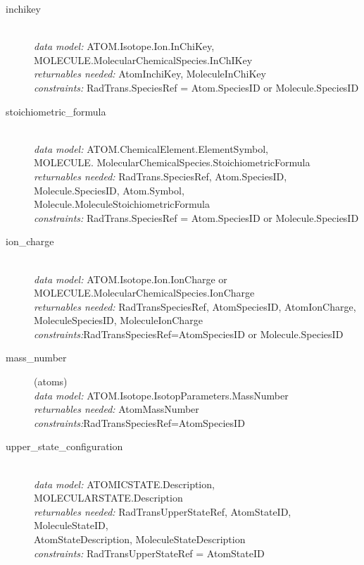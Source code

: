 \documentclass[11pt,a4paper]{ivoa}
\begin{document}
\begin{description}
\item [inchikey] \hfill\\
	\textit{data model:} ATOM.Isotope.Ion.InChiKey, 
MOLECULE.MolecularChemicalSpecies.InChIKey \\
         \textit{returnables needed:} AtomInchiKey, MoleculeInChiKey\\
         \textit{constraints:} RadTrans.SpeciesRef = Atom.SpeciesID or  Molecule.SpeciesID

\item [stoichiometric\_formula] \hfill\\
	\textit{data model:} ATOM.ChemicalElement.ElementSymbol,\\ MOLECULE. 
MolecularChemicalSpecies.StoichiometricFormula\\
	\textit{returnables needed:} RadTrans.SpeciesRef, Atom.SpeciesID, 
Molecule.SpeciesID, Atom.Symbol, Molecule.MoleculeStoichiometricFormula\\
	\textit{constraints:}  RadTrans.SpeciesRef = Atom.SpeciesID or  Molecule.SpeciesID

\item [ion\_charge]\hfill\\
	\textit{data model:} ATOM.Isotope.Ion.IonCharge or 
MOLECULE.MolecularChemicalSpecies.IonCharge \\
	\textit{returnables needed:} RadTransSpeciesRef, AtomSpeciesID, AtomIonCharge, 
MoleculeSpeciesID, MoleculeIonCharge \\
	\textit{constraints:}RadTransSpeciesRef=AtomSpeciesID or  Molecule.SpeciesID

	\item [mass\_number] (atoms)\hfill\\
	\textit{data model:} ATOM.Isotope.IsotopParameters.MassNumber \\
	\textit{returnables needed:} AtomMassNumber\\
	\textit{constraints:}RadTransSpeciesRef=AtomSpeciesID

	\item [upper\_state\_configuration]\hfill\\
	\textit{data model:} ATOMICSTATE.Description, MOLECULARSTATE.Description\\
	\textit{returnables needed:} RadTransUpperStateRef, AtomStateID, 
MoleculeStateID,\\ 
AtomStateDescription, MoleculeStateDescription\\
	\textit{constraints:}  RadTransUpperStateRef = AtomStateID


\end{description}
\end{document}

